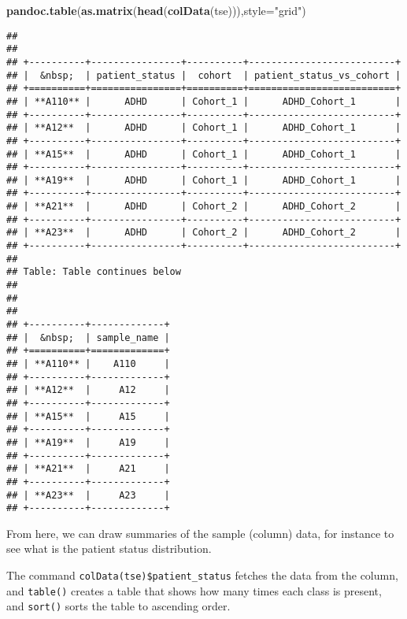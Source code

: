 \documentclass[
  oneside]{book}
\newenvironment{Shaded}{\begin{snugshade}}{\end{snugshade}}
\newcommand{\DataTypeTok}[1]{\textcolor[rgb]{0.13,0.29,0.53}{#1}}
\newcommand{\KeywordTok}[1]{\textcolor[rgb]{0.13,0.29,0.53}{\textbf{#1}}}
\newcommand{\NormalTok}[1]{#1}
\newcommand{\StringTok}[1]{\textcolor[rgb]{0.31,0.60,0.02}{#1}}
\begin{document}
\begin{Shaded}
\begin{Highlighting}[]
\KeywordTok{pandoc.table}\NormalTok{(}\KeywordTok{as.matrix}\NormalTok{(}\KeywordTok{head}\NormalTok{(}\KeywordTok{colData}\NormalTok{(tse))),}\DataTypeTok{style=}\StringTok{"grid"}\NormalTok{)}
\end{Highlighting}
\end{Shaded}

\begin{verbatim}
## 
## 
## +----------+----------------+----------+--------------------------+
## |  &nbsp;  | patient_status |  cohort  | patient_status_vs_cohort |
## +==========+================+==========+==========================+
## | **A110** |      ADHD      | Cohort_1 |      ADHD_Cohort_1       |
## +----------+----------------+----------+--------------------------+
## | **A12**  |      ADHD      | Cohort_1 |      ADHD_Cohort_1       |
## +----------+----------------+----------+--------------------------+
## | **A15**  |      ADHD      | Cohort_1 |      ADHD_Cohort_1       |
## +----------+----------------+----------+--------------------------+
## | **A19**  |      ADHD      | Cohort_1 |      ADHD_Cohort_1       |
## +----------+----------------+----------+--------------------------+
## | **A21**  |      ADHD      | Cohort_2 |      ADHD_Cohort_2       |
## +----------+----------------+----------+--------------------------+
## | **A23**  |      ADHD      | Cohort_2 |      ADHD_Cohort_2       |
## +----------+----------------+----------+--------------------------+
## 
## Table: Table continues below
## 
##  
## 
## +----------+-------------+
## |  &nbsp;  | sample_name |
## +==========+=============+
## | **A110** |    A110     |
## +----------+-------------+
## | **A12**  |     A12     |
## +----------+-------------+
## | **A15**  |     A15     |
## +----------+-------------+
## | **A19**  |     A19     |
## +----------+-------------+
## | **A21**  |     A21     |
## +----------+-------------+
## | **A23**  |     A23     |
## +----------+-------------+
\end{verbatim}

From here, we can draw summaries of the sample (column) data, for
instance to see what is the patient status distribution.

The command \texttt{colData(tse)\$patient\_status} fetches the data from the
column, and \texttt{table()} creates a table that shows how many times each
class is present, and \texttt{sort()} sorts the table to ascending order.
\end{document}
